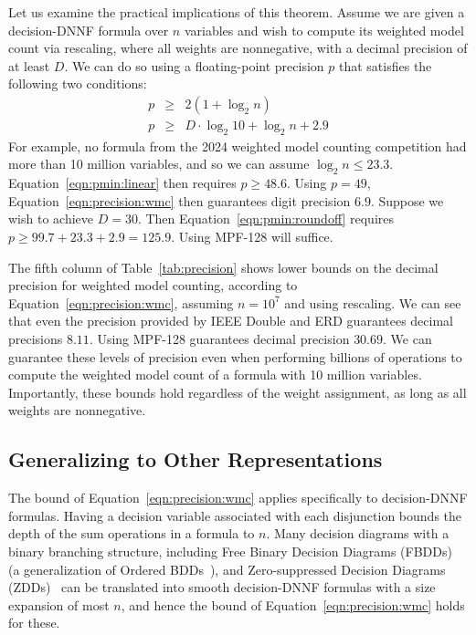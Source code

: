\documentclass{easychair}
\begin{document}
Let us examine the practical implications of this theorem.  Assume we are given a decision-DNNF formula over $n$
variables and wish to compute its weighted model count via rescaling, where all weights are nonnegative, with a decimal
precision of at least $D$.  We can do so using a floating-point precision $p$ that satisfies the following two conditions:
\begin{eqnarray}
  p & \geq & 2(1 + \log_2 n) \label{eqn:pmin:linear} \\
  p & \geq & D \cdot \log_2 10 +\log_2 n + 2.9 \label{eqn:pmin:roundoff}
\end{eqnarray}
For example, no formula from the 2024 weighted model counting
competition had more than 10 million variables, and so we can assume
$\log_2 n \leq 23.3$.  Equation~\ref{eqn:pmin:linear} then requires $p \geq 48.6$.
Using $p = 49$, Equation~\ref{eqn:precision:wmc} then guarantees digit precision $6.9$.
Suppose we wish to achieve $D = 30$.  Then
Equation~\ref{eqn:pmin:roundoff} requires $p \geq 99.7 + 23.3 + 2.9 =
125.9$.  Using MPF-128 will suffice.

The fifth column of Table~\ref{tab:precision} shows lower bounds on
the decimal precision for weighted model counting, according to Equation~\ref{eqn:precision:wmc},
assuming $n = 10^7$ and using rescaling.  We can see that even the precision provided by IEEE Double and ERD
guarantees decimal precisions $8.11$.
Using MPF-128 guarantees decimal precision $30.69$.
We can guarantee these levels of precision 
even when 
performing billions of operations to
compute the weighted model count of a formula with 10 million variables.
Importantly, these bounds hold regardless of the weight assignment, as long as all weights are nonnegative.

\subsection{Generalizing to Other Representations}
\label{sect:ddnnf}

The bound of Equation~\ref{eqn:precision:wmc} applies specifically to decision-DNNF
formulas.  Having a decision variable associated with each disjunction
bounds the depth of the sum operations in a formula to $n$.  Many
decision diagrams with a binary branching structure, including Free
Binary Decision Diagrams (FBDDs)~\cite{wegener:siam:2000}
(a generalization of Ordered BDDs~\cite{bryant:ieeetc:1986,knuth:bdd:2011}), and Zero-suppressed Decision
Diagrams (ZDDs)~\cite{minato:sttt:2001,minato:ijcai:2007} can be
translated into smooth decision-DNNF formulas with a size expansion of
most $n$, and hence the bound of Equation~\ref{eqn:precision:wmc}
holds for these.
\end{document}
